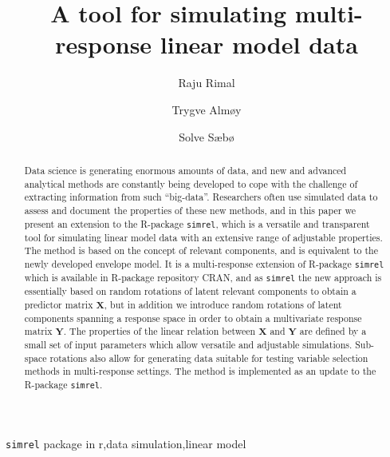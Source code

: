 \documentclass[review]{elsarticle}
\theoremstyle{definition}
\theoremstyle{definition}
\theoremstyle{definition}
\theoremstyle{remark}
\begin{document}
\begin{frontmatter}

  \title{A tool for simulating multi-response linear model data}
  
    \author[KBM]{Raju Rimal}
    \author[KBM]{Trygve Almøy}
  
    \author[NMBU]{Solve Sæbø}
  
      \address[KBM]{Faculty of Chemistry and Bioinformatics, Norwegian University of Life
Sciences, Ås, Norway}
    \address[NMBU]{Prorector, Norwegian University of Life Sciences, Ås, Norway}
  
  \begin{abstract}
  Data science is generating enormous amounts of data, and new and
  advanced analytical methods are constantly being developed to cope with
  the challenge of extracting information from such ``big-data''.
  Researchers often use simulated data to assess and document the
  properties of these new methods, and in this paper we present an
  extension to the R-package \texttt{simrel}, which is a versatile and
  transparent tool for simulating linear model data with an extensive
  range of adjustable properties. The method is based on the concept of
  relevant components, and is equivalent to the newly developed envelope
  model. It is a multi-response extension of R-package \texttt{simrel}
  which is available in R-package repository CRAN, and as \texttt{simrel}
  the new approach is essentially based on random rotations of latent
  relevant components to obtain a predictor matrix \(\mathbf{X}\), but in
  addition we introduce random rotations of latent components spanning a
  response space in order to obtain a multivariate response matrix
  \(\mathbf{Y}\). The properties of the linear relation between
  \(\mathbf{X}\) and \(\mathbf{Y}\) are defined by a small set of input
  parameters which allow versatile and adjustable simulations. Sub-space
  rotations also allow for generating data suitable for testing variable
  selection methods in multi-response settings. The method is implemented
  as an update to the R-package \texttt{simrel}.
  \end{abstract}
   \begin{keyword} \texttt{simrel} package in r,data simulation,linear model\end{keyword}

\end{frontmatter}
\end{document}
